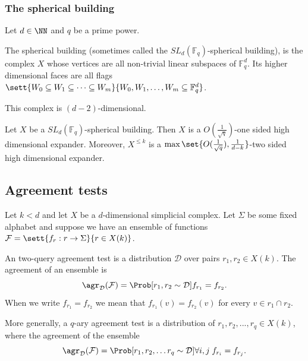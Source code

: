 \subsubsection*{The spherical building}
Let \(d \in \NN\) and \(q\) be a prime power. 
\begin{definition}\label{def:sph-bldg}
    The spherical building (sometimes called the \(SL_d(\mathbb{F}_q)\)-spherical building), is the complex \(X\) whose vertices are all non-trivial linear subspaces of \(\mathbb{F}_q^d\). Its higher dimensional faces are all flags \(\sett{W_0 \subseteq W_1 \subseteq \dots \subseteq W_m}{W_0,W_1,\dots,W_m \subseteq \mathbb{F}_q^d}\). 
\end{definition}
This complex is \((d-2)\)-dimensional.

\begin{claim} \label{claim:spherical-building-hdxness}
    Let \(X\) be a \(SL_d(\mathbb{F}_q)\)-spherical building. Then \(X\) is a \(O(\frac{1}{\sqrt{q}})\)-one sided high dimensional expander. Moreover, \(X^{\leq k}\) is a \(\max \set{O(\frac{1}{\sqrt{q}}), \frac{1}{d-k}}\)-two sided high dimensional expander.
\end{claim}

\subsection{Agreement tests} \label{sec:agreement-tests}

Let \(k<d\) and let \(X\) be a \(d\)-dimensional simplicial complex. Let \(\Sigma\) be some fixed alphabet and suppose we have an ensemble of functions \(\mathcal{F} = \sett{f_r:r\to \Sigma}{r \in X(k)}\).%

An two-query agreement test is a distribution \(\mathcal{D}\) over pairs \(r_1,r_2 \in X(k)\). The agreement of an ensemble is
\begin{equation}
    \agr_{\mathcal{D}}(\mathcal{F}) = \Prob[r_1,r_2\sim \mathcal{D}]{f_{r_1} = f_{r_2}}.
\end{equation}
When we write \(f_{r_1} = f_{r_2}\) we mean that \(f_{r_1}(v)=f_{r_2}(v)\) for every \(v \in r_1 \cap r_2\).

More generally, a \(q\)-ary agreement test is a distribution of \(r_1,r_2,...,r_q \in X(k)\), where the agreement of the ensemble
\begin{equation}
    \agr_{\mathcal{D}}(\mathcal{F}) = \Prob[r_1,r_2,\dots r_q \sim \mathcal{D}]{\forall i,j \; f_{r_i} = f_{r_j}}.
\end{equation}

